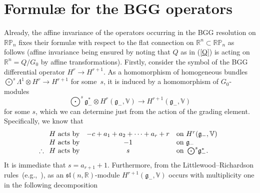 \documentclass[11pt]{article}
\begin{document}
\section{Formul{\ae} for the BGG operators}
Already, the af\/f\/ine invariance of the operators occurring in the BGG resolution
on ${\mathbb{RP}}_n$ f\/ixes their formul{\ae} with respect to the f\/lat
connection on ${\mathbb{R}}^n\subset{\mathbb{RP}}_n$ as follows (af\/f\/ine
invariance being ensured by noting that $Q$ as in (\ref{Q}) is acting on
${\mathbb{R}}^n=Q/G_0$ by af\/f\/ine transformations). Firstly, consider the symbol
of the BGG dif\/ferential operator $H^r\to H^{r+1}$. As a homomorphism of
homogeneous bundles $\bigodot^s\!\Lambda^1\otimes H^r\to H^{r+1}$ for
some~$s$, it is induced by a homomorphism of $G_0$-modules
\[\textstyle
\bigodot^s\!{\mathfrak{g}}_-^*\otimes H^r({\mathfrak{g}}_-,{\mathbb{V}})\to
H^{r+1}({\mathfrak{g}}_-,{\mathbb{V}})\]
for some $s$, which we can determine just from the action of the grading
element. Specif\/ically, we know that
\[\begin{array}{@{}rcl}
H\mbox{ acts by}&-c+a_1+a_2+\cdots+a_r+r&
\mbox{on }H^r({\mathfrak{g}}_-,{\mathbb{V}})\\
H\mbox{ acts by}&-1&
\mbox{on }{\mathfrak{g}}_-\\
\therefore\enskip H\mbox{ acts by}&s&
\mbox{on }\bigodot^s\!{\mathfrak{g}}_-^*.
\end{array}\]
It is immediate that $s=a_{r+1}+1$. Furthermore, from the
Littlewood--Richardson rules~(e.g.,~\cite{fh}), as an
${\mathfrak{sl}}(n,{\mathbb{R}})$-module
$H^{r+1}({\mathfrak{g}}_-,{\mathbb{V}})$ occurs with multiplicity one in the
following decomposition
\end{document}
